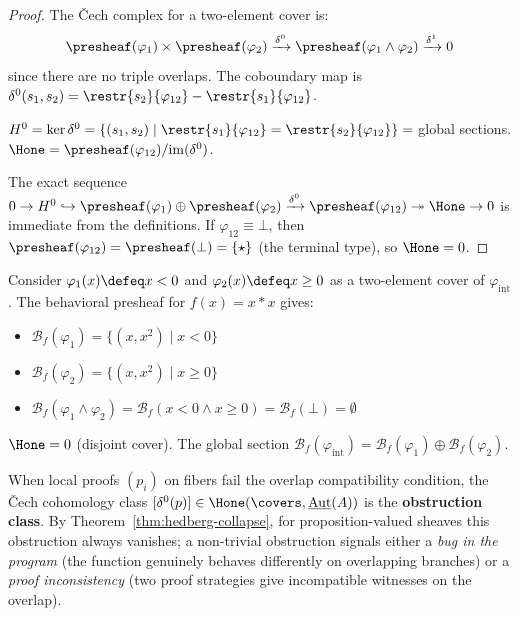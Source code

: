 \begin{proof}
The \v{C}ech complex for a two-element cover is:
\[
  \presheaf(\varphi_1) \times \presheaf(\varphi_2)
  \xrightarrow{\delta^0}
  \presheaf(\varphi_1 \wedge \varphi_2)
  \xrightarrow{\delta^1} 0
\]
since there are no triple overlaps.  The coboundary map is
$\delta^0(s_1, s_2) = \restr{s_2}{\varphi_{12}} -
\restr{s_1}{\varphi_{12}}$.

$H^0 = \ker \delta^0 = \{(s_1, s_2) \mid \restr{s_1}{\varphi_{12}} =
\restr{s_2}{\varphi_{12}}\} = $ global sections.
$\Hone = \presheaf(\varphi_{12}) / \mathrm{im}(\delta^0)$.

The exact sequence $0 \to H^0 \hookrightarrow \presheaf(\varphi_1) \oplus
\presheaf(\varphi_2) \xrightarrow{\delta^0} \presheaf(\varphi_{12})
\twoheadrightarrow \Hone \to 0$ is immediate from the definitions.  If
$\varphi_{12} \equiv \bot$, then $\presheaf(\varphi_{12}) = \presheaf(\bot)
= \{\star\}$ (the terminal type), so $\Hone = 0$.
\end{proof}

\begin{example}
Consider $\varphi_1(x) \defeq x < 0$ and $\varphi_2(x) \defeq x \ge 0$
as a two-element cover of $\varphi_{\mathrm{int}}$.  The behavioral
presheaf for $f(x) = x * x$ gives:
\begin{itemize}
\item $\mathcal{B}_f(\varphi_1) = \{(x, x^2) \mid x < 0\}$
\item $\mathcal{B}_f(\varphi_2) = \{(x, x^2) \mid x \ge 0\}$
\item $\mathcal{B}_f(\varphi_1 \wedge \varphi_2) = \mathcal{B}_f(x<0
  \wedge x\ge 0) = \mathcal{B}_f(\bot) = \emptyset$
\end{itemize}
$\Hone = 0$ (disjoint cover).  The global section
$\mathcal{B}_f(\varphi_{\mathrm{int}}) = \mathcal{B}_f(\varphi_1) \oplus
\mathcal{B}_f(\varphi_2)$.
\end{example}

\begin{definition}
\label{def:obstruction-ref}
When local proofs $(p_i)$ on fibers fail the overlap compatibility condition,
the \v{C}ech cohomology class $[\delta^0(p)] \in \Hone(\covers,
\underline{\mathrm{Aut}}(A))$ is the \textbf{obstruction class}.  By
Theorem~\ref{thm:hedberg-collapse}, for proposition-valued sheaves this
obstruction always vanishes; a non-trivial obstruction signals either
a \emph{bug in the program} (the function genuinely behaves differently
on overlapping branches) or a \emph{proof inconsistency} (two proof
strategies give incompatible witnesses on the overlap).
\end{definition}

